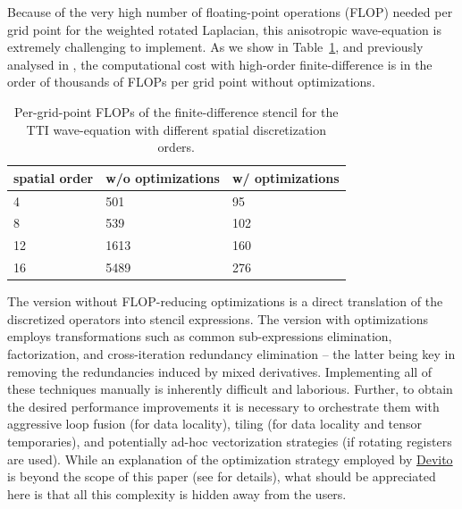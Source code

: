 \documentclass[conference]{IEEEtran}
\begin{document}
Because of the very high number of floating-point operations (FLOP)
needed per grid point for the weighted rotated Laplacian, this
anisotropic wave-equation is extremely challenging to implement. As we
show in Table~\ref{ttiFLOPs}, and previously analysed in
\cite{louboutin2016ppf}, the computational cost with high-order
finite-difference is in the order of thousands of FLOPs per grid point
without optimizations.

\begin{table}
\centering
\begin{tabular}{lll}
\toprule\addlinespace
spatial order & w/o optimizations & w/ optimizations\tabularnewline
\midrule
4 & 501 & 95\tabularnewline
8 & 539 & 102\tabularnewline
12 & 1613 & 160\tabularnewline
16 & 5489 & 276\tabularnewline
\bottomrule
\end{tabular}
\caption{Per-grid-point FLOPs of the finite-difference stencil for the
TTI wave-equation with different spatial discretization
orders.}\label{ttiFLOPs}
\end{table}

The version without FLOP-reducing optimizations is a direct translation
of the discretized operators into stencil expressions. The version with
optimizations employs transformations such as common sub-expressions
elimination, factorization, and cross-iteration redundancy elimination
-- the latter being key in removing the redundancies induced by mixed
derivatives. Implementing all of these techniques manually is inherently
difficult and laborious. Further, to obtain the desired performance
improvements it is necessary to orchestrate them with aggressive loop
fusion (for data locality), tiling (for data locality and tensor
temporaries), and potentially ad-hoc vectorization strategies (if
rotating registers are used). While an explanation of the optimization
strategy employed by
\href{https://github.com/devitocodes/devito}{Devito} is beyond the scope
of this paper (see \cite{devito-compiler} for details), what should be
appreciated here is that all this complexity is hidden away from the
users.
\end{document}
